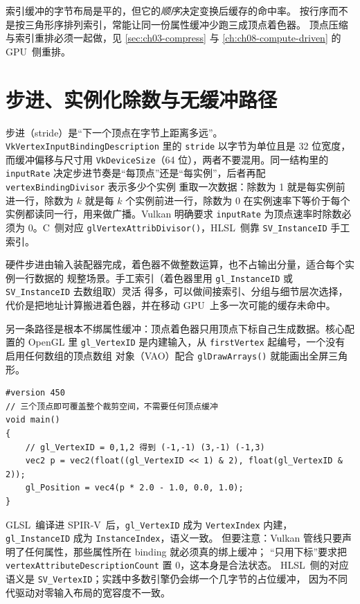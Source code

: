 \documentclass[12pt,a4paper,fontset=fandol]{ctexbook}
\newcommand{\Fn}[1]{\texttt{#1()}}
\newcommand{\Tp}[1]{\texttt{#1}}
\newcommand{\Bk}{\discretionary{}{}{}}
\newcommand{\Lang}[1]{\textsf{#1}}
\newcommand{\CL}{\Lang{C}}
\newcommand{\DomGPU}{\Lang{GPU}}
\newcommand{\GSL}{\Lang{GLSL}}
\newcommand{\HSL}{\Lang{HLSL}}
\newcommand{\SPIV}{\Lang{SPIR-V}}
\begin{document}
\begin{warning}[title={索引顺序同样是布局问题}]
  索引缓冲的字节布局是平的，但它的\emph{顺序}决定变换后缓存的命中率。
  按行序而不是按三角形序排列索引，常能让同一份属性缓冲少跑三成顶点着色器。
  顶点压缩与索引重排必须一起做，见 \ref{sec:ch03-compress}
  与 \ref{ch:ch08-compute-driven} 的 \DomGPU\ 侧重排。
\end{warning}

\section{步进、实例化除数与无缓冲路径}

步进（stride）是``下一个顶点在字节上距离多远''。
\Tp{VkVertexInputBinding\Bk Description} 里的 \Tp{stride} 以字节为单位且是 32 位宽度，
而缓冲偏移与尺寸用 \Tp{VkDeviceSize}（64 位），两者不要混用。同一结构里的 \Tp{inputRate}
决定步进节奏是``每顶点''还是``每实例''，后者再配 \Tp{vertexBindingDivisor} 表示多少个实例
重取一次数据：除数为 1 就是每实例前进一行，除数为 $k$ 就是每 $k$ 个实例前进一行，除数为 0
在实例速率下等价于每个实例都读同一行，用来做广播。Vulkan 明确要求 \Tp{inputRate}
为顶点速率时除数必须为 0。\CL\ 侧对应 \Fn{glVertexAttribDivisor}，\HSL\ 侧靠
\Tp{SV\_InstanceID} 手工索引。

\begin{compare}[title={硬件步进与手工索引}]
  硬件步进由输入装配器完成，着色器不做整数运算，也不占输出分量，适合每个实例一行数据的
  规整场景。手工索引（着色器里用 \Tp{gl\_InstanceID} 或 \Tp{SV\_InstanceID} 去数组取）灵活
  得多，可以做间接索引、分组与细节层次选择，代价是把地址计算搬进着色器，并在移动
  \DomGPU\ 上多一次可能的缓存未命中。
\end{compare}

另一条路径是根本不绑属性缓冲：顶点着色器只用顶点下标自己生成数据。核心配置的 OpenGL 里
\Tp{gl\_VertexID} 是内建输入，从 \Tp{firstVertex} 起编号，一个没有启用任何数组的顶点数组
对象（VAO）配合 \Fn{glDrawArrays} 就能画出全屏三角形。

\begin{lstlisting}[style=glslstyle,caption={无缓冲顶点输入：用内建下标生成全屏三角形},label={lst:ch03-vertexid}]
#version 450
// 三个顶点即可覆盖整个裁剪空间，不需要任何顶点缓冲
void main()
{
    // gl_VertexID = 0,1,2 得到 (-1,-1) (3,-1) (-1,3)
    vec2 p = vec2(float((gl_VertexID << 1) & 2), float(gl_VertexID & 2));
    gl_Position = vec4(p * 2.0 - 1.0, 0.0, 1.0);
}
\end{lstlisting}

\GSL\ 编译进 \SPIV\ 后，\Tp{gl\_VertexID} 成为 \Tp{VertexIndex} 内建，
\Tp{gl\_InstanceID} 成为 \Tp{InstanceIndex}，语义一致。
但要注意：Vulkan 管线只要声明了任何属性，那些属性所在 binding 就必须真的绑上缓冲；
``只用下标''要求把 \Tp{vertexAttributeDescriptionCount} 置 0，这本身是合法状态。
\HSL\ 侧的对应语义是 \Tp{SV\_VertexID}；实践中多数引擎仍会绑一个几字节的占位缓冲，
因为不同代驱动对零输入布局的宽容度不一致。
\end{document}
